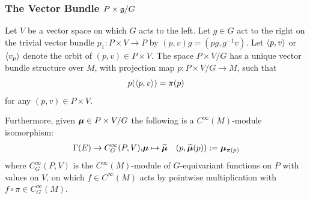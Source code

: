 
\subsubsection{The Vector Bundle $P \times \mathfrak{g} / G$}

\begin{proposition} \label{propAssociatedExists}
    Let $V$ be a vector space on which $G$ acts to the left. Let $g \in G$ act to the right on the trivial vector bundle $p_1 :P \times V \to P$ by $(p, v)g = (pg, g^{-1}v)$. Let $\left\langle p, v \right\rangle$ or $\left\langle v_p \right\rangle$ denote the orbit of $(p, v) \in P \times V$. The space $P \times V/G$ has a unique vector bundle structure over $M$, with projection map $p: P \times V / G \to M$, such that \begin{align}
        p(\left\langle p, v \right\rangle) = \pi(p)
    \end{align} for any $(p, v) \in P \times V$.
    
    Furthermore, given $\bm{\mu} \in P \times V/G$ the following is a $C^\infty(M)$-module isomorphism: 
    \begin{align}\label{defnTilde}
        \Gamma(E) \to C^\infty_G(P, V), & \bm{\mu} \mapsto \widetilde{\bm{\mu}} & (p, \widetilde{\bm{\mu}}(p)) := \bm{\mu}_{\pi(p)}
    \end{align}
     where $C^\infty_G(P, V)$ is the $C^\infty(M)$-module of $G$-equivariant functions on $P$ with values on $V$, on which $f \in C^\infty(M)$ acts by pointwise multiplication with $f \circ \pi \in C^\infty_G(M)$. 
\end{proposition}

